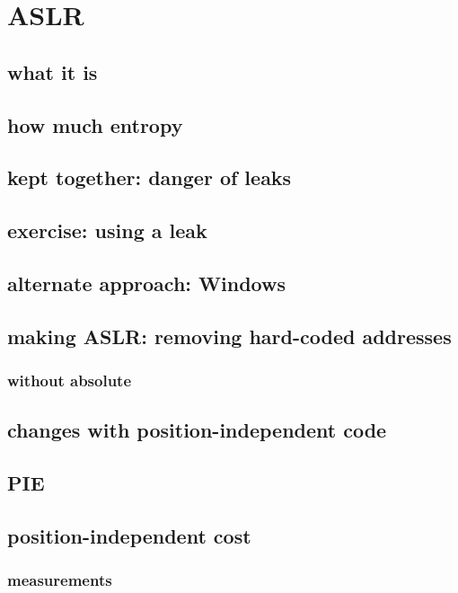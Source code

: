 

\section{ASLR}
\subsection{what it is}


\subsection{how much entropy}


\subsection{kept together: danger of leaks}



\subsection{exercise: using a leak}



\subsection{alternate approach: Windows}


\subsection{making ASLR: removing hard-coded addresses}


\subsubsection{without absolute}


\subsection{changes with position-independent code}


\subsection{PIE}


\subsection{position-independent cost}


\subsubsection{measurements}

